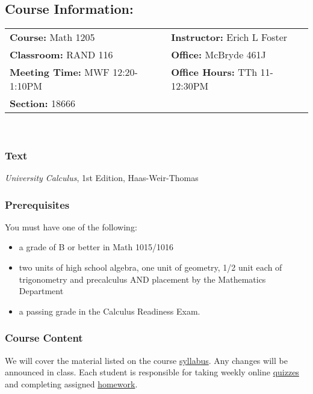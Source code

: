 \documentclass{article}
\begin{document}
		\begin{centering}\subsection*{Course Information:}\end{centering}
		\begin{tabular}{ll}
				\textbf{Course:} Math 1205 &
				\textbf{Instructor:} Erich L Foster \\
				\textbf{Classroom:} RAND 116 & 
				\textbf{Office:} McBryde 461J \\
				\textbf{Meeting Time:} MWF 12:20-1:10PM &
				\textbf{Office Hours:} TTh 11-12:30PM \\
				\textbf{Section:} 18666
		\end{tabular} \\
			
			\subsubsection*{Text} 
			\emph{University Calculus}, 1st Edition, Haas-Weir-Thomas

			\subsubsection*{Prerequisites} 
			You must have one of the following: 
			\begin{itemize}
				\item   a grade of B or better in Math 1015/1016
				\item   two units of high school algebra, one unit of geometry,
					1/2 unit each of trigonometry and precalculus AND placement by
					the Mathematics Department
				\item   a passing grade in the Calculus Readiness Exam.
			\end{itemize} 
				
			\subsubsection*{Course Content} 
			We will cover the material listed on the course
			\href{http://www.emporium.vt.edu/math1205/resources/syllabus.html}{syllabus}.
			Any changes will be announced in class. Each student is responsible for
			taking weekly online
			\href{http://www.emporium.vt.edu/math1205/resources/quizzes}{quizzes} and
			completing assigned
			\href{http://www.math.vt.edu/people/erichlf/1205HWS11.html}{homework}.
\end{document}
